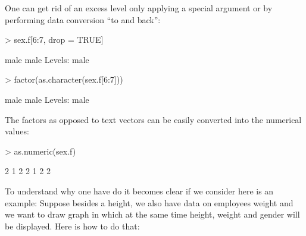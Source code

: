 \documentclass[a4paper,11pt]{scrartcl}
\begin{document}
One can get rid of an excess level only applying a special argument or by performing data conversion “to and back”:
\begin{Schunk}
\begin{Sinput}
> sex.f[6:7, drop = TRUE]
\end{Sinput}
\begin{Soutput}
[1] male male
Levels: male
\end{Soutput}
\begin{Sinput}
> factor(as.character(sex.f[6:7]))
\end{Sinput}
\begin{Soutput}
[1] male male
Levels: male
\end{Soutput}
\end{Schunk}
The factors as opposed to text vectors can be easily converted into the numerical values:
\begin{Schunk}
\begin{Sinput}
> as.numeric(sex.f)
\end{Sinput}
\begin{Soutput}
[1] 2 1 2 2 1 2 2
\end{Soutput}
\end{Schunk}

To understand why one have do it becomes clear if we consider here is an example: Suppose besides a height, we also have data on employees weight and we want to draw graph in which at the same time height, weight and gender will be displayed. Here is how to do that:
\end{document}

